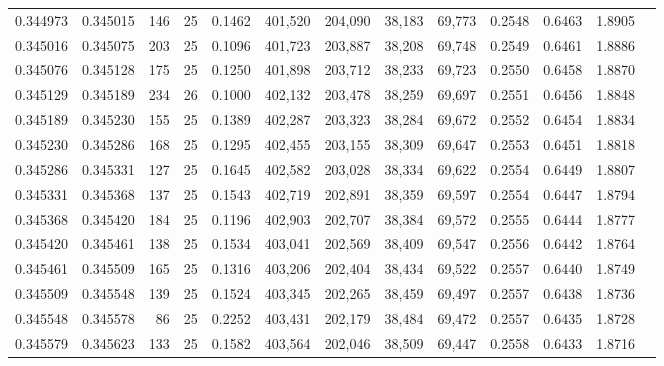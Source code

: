 \begin{tabular}{rrrrrrrrrrrrr}
0.344973 & 0.345015 &   146 &  25 &                                     0.1462 & 401,520 & 204,090 &  38,183 &  69,773 & 0.2548 & 0.6463 & 1.8905 \\
0.345016 & 0.345075 &   203 &  25 &                                     0.1096 & 401,723 & 203,887 &  38,208 &  69,748 & 0.2549 & 0.6461 & 1.8886 \\
0.345076 & 0.345128 &   175 &  25 &                                     0.1250 & 401,898 & 203,712 &  38,233 &  69,723 & 0.2550 & 0.6458 & 1.8870 \\
0.345129 & 0.345189 &   234 &  26 &                                     0.1000 & 402,132 & 203,478 &  38,259 &  69,697 & 0.2551 & 0.6456 & 1.8848 \\
0.345189 & 0.345230 &   155 &  25 &                                     0.1389 & 402,287 & 203,323 &  38,284 &  69,672 & 0.2552 & 0.6454 & 1.8834 \\
0.345230 & 0.345286 &   168 &  25 &                                     0.1295 & 402,455 & 203,155 &  38,309 &  69,647 & 0.2553 & 0.6451 & 1.8818 \\
0.345286 & 0.345331 &   127 &  25 &                                     0.1645 & 402,582 & 203,028 &  38,334 &  69,622 & 0.2554 & 0.6449 & 1.8807 \\
0.345331 & 0.345368 &   137 &  25 &                                     0.1543 & 402,719 & 202,891 &  38,359 &  69,597 & 0.2554 & 0.6447 & 1.8794 \\
0.345368 & 0.345420 &   184 &  25 &                                     0.1196 & 402,903 & 202,707 &  38,384 &  69,572 & 0.2555 & 0.6444 & 1.8777 \\
0.345420 & 0.345461 &   138 &  25 &                                     0.1534 & 403,041 & 202,569 &  38,409 &  69,547 & 0.2556 & 0.6442 & 1.8764 \\
0.345461 & 0.345509 &   165 &  25 &                                     0.1316 & 403,206 & 202,404 &  38,434 &  69,522 & 0.2557 & 0.6440 & 1.8749 \\
0.345509 & 0.345548 &   139 &  25 &                                     0.1524 & 403,345 & 202,265 &  38,459 &  69,497 & 0.2557 & 0.6438 & 1.8736 \\
0.345548 & 0.345578 &    86 &  25 &                                     0.2252 & 403,431 & 202,179 &  38,484 &  69,472 & 0.2557 & 0.6435 & 1.8728 \\
0.345579 & 0.345623 &   133 &  25 &                                     0.1582 & 403,564 & 202,046 &  38,509 &  69,447 & 0.2558 & 0.6433 & 1.8716 \\

\end{tabular}
